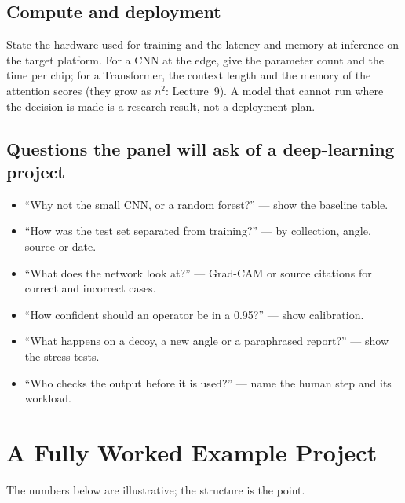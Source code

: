 \documentclass[11pt]{article}
\begin{document}
\subsection{Compute and deployment}
State the hardware used for training and the latency and memory at inference on the target platform. For a CNN at the edge, give the parameter count and the time per chip; for a Transformer, the context length and the memory of the attention scores (they grow as $n^2$: Lecture~9). A model that cannot run where the decision is made is a research result, not a deployment plan.

\subsection{Questions the panel will ask of a deep-learning project}
\begin{itemize}
\item ``Why not the small CNN, or a random forest?'' --- show the baseline table.
\item ``How was the test set separated from training?'' --- by collection, angle, source or date.
\item ``What does the network look at?'' --- Grad-CAM or source citations for correct and incorrect cases.
\item ``How confident should an operator be in a 0.95?'' --- show calibration.
\item ``What happens on a decoy, a new angle or a paraphrased report?'' --- show the stress tests.
\item ``Who checks the output before it is used?'' --- name the human step and its workload.
\end{itemize}

\section{A Fully Worked Example Project}
The numbers below are illustrative; the structure is the point.
\end{document}
